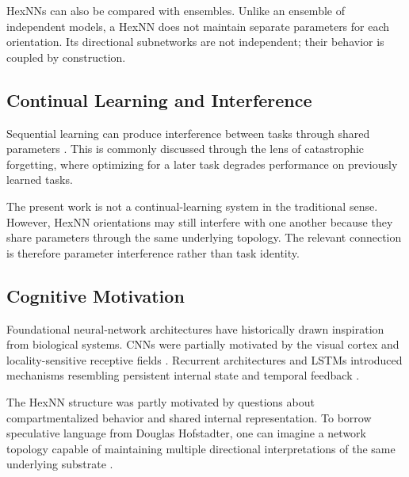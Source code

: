 HexNNs can also be compared with ensembles.
Unlike an ensemble of independent models, a HexNN does not maintain separate parameters for each orientation.
Its directional subnetworks are not independent; their behavior is coupled by construction.


\subsection{Continual Learning and Interference}

Sequential learning can produce interference between tasks through shared parameters \cite{kirkpatrick2017overcoming}.
This is commonly discussed through the lens of catastrophic forgetting, where optimizing for a later task degrades performance on previously learned tasks.

The present work is not a continual-learning system in the traditional sense.
However, HexNN orientations may still interfere with one another because they share parameters through the same underlying topology.
The relevant connection is therefore parameter interference rather than task identity.


\subsection{Cognitive Motivation}

Foundational neural-network architectures have historically drawn inspiration from biological systems.
CNNs were partially motivated by the visual cortex and locality-sensitive receptive fields \cite{fukushima1980neocognitron,lecun1998gradient}.
Recurrent architectures and LSTMs introduced mechanisms resembling persistent internal state and temporal feedback \cite{hochreiter1997long}.

The HexNN structure was partly motivated by questions about compartmentalized behavior and shared internal representation.
To borrow speculative language from Douglas Hofstadter, one can imagine a network topology capable of maintaining multiple directional interpretations of the same underlying substrate \cite{hofstadter1979geb,hofstadter2007strange}.

